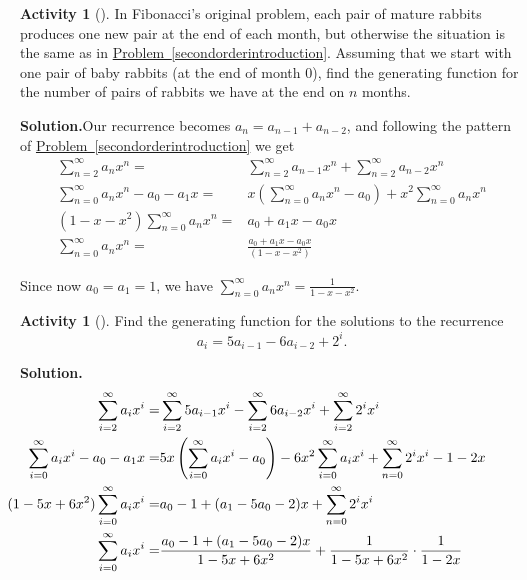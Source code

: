 \documentclass[10pt,]{book}
\theoremstyle{plain}
\theoremstyle{definition}
\newtheorem{activity}[project]{Activity}
\numberwithin{equation}{chapter}
\newcommand{\amp}{&}
\begin{document}
\begin{activity}[]\label{originalFibonacci}
In Fibonacci's original problem, each pair of mature rabbits produces one new pair at the end of each month, but otherwise the situation is the same as in \hyperref[secondorderintroduction]{Problem~\ref{secondorderintroduction}}.  Assuming that we start with one pair of baby rabbits (at the end of month 0), find the generating function for the number of pairs of rabbits we have at the end on \(n\) months.%
\par\medskip\noindent%
\textbf{Solution.}\quad Our recurrence becomes \(a_n=a_{n-1}+a_{n-2}\), and following the pattern of \hyperref[secondorderintroduction]{Problem~\ref{secondorderintroduction}} we get%
\begin{align*}
\sum_{n=2}^\infty a_nx^n =\amp \sum_{n=2}^\infty a_{n-1}x^n +
\sum_{n=2}^\infty a_{n-2}x^n\\
\sum_{n=0}^\infty a_nx^n-a_0-a_1x  =\amp x\left(\sum_{n=0}^\infty
a_{n}x^{n}-a_0\right) + x^2\sum_{n=0}^\infty a_{n}x^n\\
(1-x-x^2)\sum_{n=0}^\infty a_nx^n =\amp a_0+a_1x-a_0x\\
\sum_{n=0}^\infty a_nx^n =\amp \frac{a_0+a_1x-a_0x}{(1-x-x^2)}
\end{align*}
%
\par
Since now \(a_0=a_1=1\), we have \(\displaystyle \sum_{n=0}^\infty a_nx^n=
\frac{1}{1-x-x^2}\).%
\end{activity}
\begin{activity}[]\label{secondordernonhomo}
Find the generating function for the solutions to the recurrence%
\begin{equation*}
a_i=5a_{i-1}-6a_{i-2} + 2^i.
\end{equation*}
%
\par\medskip\noindent%
\textbf{Solution.}\quad %
\begin{align*}
\sum_{i=2}^\infty a_ix^i  =\amp  \sum_{i=2}^\infty
5a_{i-1}x^i-\sum_{i=2}^\infty 6a_{i-2}x^i + \sum_{i=2}^\infty 2^ix^i\\
\hspace{-.3in}\sum_{i=0}^\infty a_ix^i -a_0-a_1x  =\amp
5x\left(\sum_{i=0}^\infty
a_{i}x^i-a_0\right)-6x^2\sum_{i=0}^\infty a_{i}x^i + \sum_{n=0}^\infty
2^ix^i-1-2x\\
\hspace{-.55in}(1-5x+6x^2)\sum_{i=0}^\infty a_ix^i =\amp a_0-1+(a_1-5a_0-2)x +
\sum_{n=0}^\infty 2^ix^i\\
\sum_{i=0}^\infty a_ix^i =\amp  \frac{a_0-1+(a_1-5a_0-2)x}{1-5x+6x^2}+ \frac{1}{1-5x+6x^2}\cdot\frac{1}{1-2x}
\end{align*}
%
\end{activity}
\end{document}
